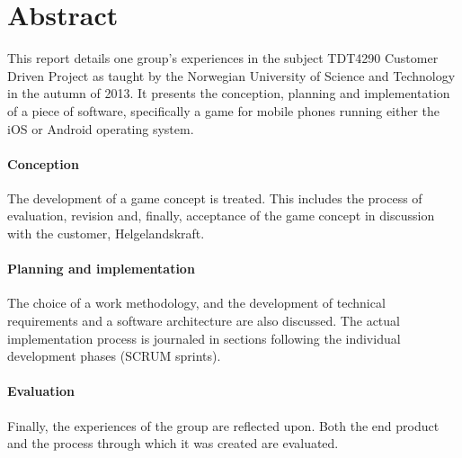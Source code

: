 \thispagestyle{empty}

\section*{Abstract}

This report details one group's experiences in the subject TDT4290 Customer
Driven Project as taught by the Norwegian University of Science and Technology
in the autumn of 2013. It presents the conception, planning and implementation
of a piece of software, specifically a game for mobile phones running either
the iOS or Android operating system.

\paragraph{Conception}
The development of a game concept is treated. This includes the process of
evaluation, revision and, finally, acceptance of the game concept in discussion
with the customer, Helgelandskraft.

\paragraph{Planning and implementation}
The choice of a work methodology, and the development of technical requirements
and a software architecture are also discussed. The actual implementation
process is journaled in sections following the individual development phases
(SCRUM sprints).

\paragraph{Evaluation}
Finally, the experiences of the group are reflected upon. Both the end product
and the process through which it was created are evaluated.
